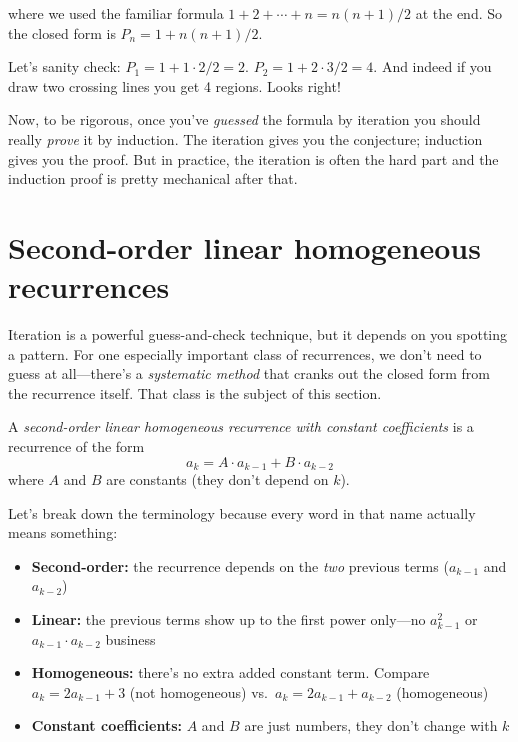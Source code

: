 \documentclass[11pt]{article}
\begin{document}
where we used the familiar formula $1 + 2 + \cdots + n = n(n+1)/2$ at the end. So the closed form is $P_n = 1 + n(n+1)/2$.

Let's sanity check: $P_1 = 1 + 1 \cdot 2/2 = 2$. $P_2 = 1 + 2 \cdot 3/2 = 4$. And indeed if you draw two crossing lines you get 4 regions. Looks right!

Now, to be rigorous, once you've \emph{guessed} the formula by iteration you should really \emph{prove} it by induction. The iteration gives you the conjecture; induction gives you the proof. But in practice, the iteration is often the hard part and the induction proof is pretty mechanical after that.

\section{Second-order linear homogeneous recurrences}
Iteration is a powerful guess-and-check technique, but it depends on you spotting a pattern. For one especially important class of recurrences, we don't need to guess at all---there's a \emph{systematic method} that cranks out the closed form from the recurrence itself. That class is the subject of this section.

\begin{definition}
A \emph{second-order linear homogeneous recurrence with constant coefficients} is a recurrence of the form
\[
a_k = A \cdot a_{k-1} + B \cdot a_{k-2}
\]
where $A$ and $B$ are constants (they don't depend on $k$).
\end{definition}

\noindent Let's break down the terminology because every word in that name actually means something:

\begin{itemize}
  \item \textbf{Second-order:} the recurrence depends on the \emph{two} previous terms ($a_{k-1}$ and $a_{k-2}$)
  \item \textbf{Linear:} the previous terms show up to the first power only---no $a_{k-1}^2$ or $a_{k-1} \cdot a_{k-2}$ business
  \item \textbf{Homogeneous:} there's no extra added constant term. Compare $a_k = 2a_{k-1} + 3$ (not homogeneous) vs.\ $a_k = 2a_{k-1} + a_{k-2}$ (homogeneous)
  \item \textbf{Constant coefficients:} $A$ and $B$ are just numbers, they don't change with $k$
\end{itemize}
\end{document}
